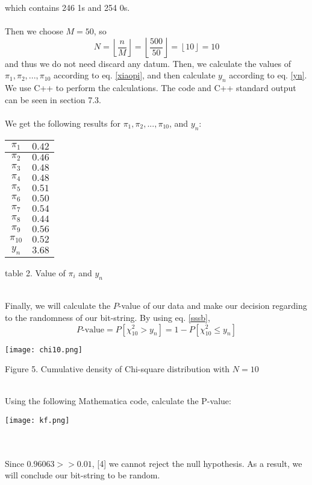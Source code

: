 \documentclass[a4paper,12pt]{article}
\begin{document}
\noindent which contains 246 1s and 254 0s.\\\\
Then we choose $M=50$, so $$N=\left\lfloor\frac{n}{M}\right\rfloor=
\left\lfloor\frac{500}{50}\right\rfloor=
\left\lfloor{10}\right\rfloor=10$$
 and thus we do not need discard any datum. Then, we calculate the values of $\pi_1,\pi_2,...,\pi_{10}$ according to eq. \eqref{xiaopi}, and then calculate $y_n$ according to eq. \eqref{yn}. We use C++ to perform the calculations. The code  and C++ standard output can be seen in section 7.3.
\\\\
We get the following results for $\pi_1,\pi_2,...,\pi_{10}$, and $y_n$:\\
\begin{table}[H]\centering
\begin{tabular}{|c|c|}
\hline
$\pi_1$ & $0.42$  \\ \hline
$\pi_2$ & $0.46$  \\ \hline
$\pi_3$ & $0.48$  \\ \hline
$\pi_4$ & $0.48$  \\ \hline
$\pi_5$ & $0.51$  \\ \hline
$\pi_6$ & $0.50$  \\ \hline
$\pi_7$ & $0.54$  \\ \hline
$\pi_8$ & $0.44$  \\ \hline
$\pi_9$ & $0.56$  \\ \hline
$\pi_{10}$ & $0.52$  \\ \hline
$y_n$ & $3.68$  \\ \hline
\end{tabular}
\end{table}
\centerline{table 2. Value of $\pi_i$ and $y_n$}
\noindent \\Finally, we will calculate the $P$-value of our data and make our decision regarding to the randomness of our bit-string. By using eq. \eqref{sssb},
$$
P\text{-value}=P\left[\chi_{10}^{2}>y_{n}\right]=1-P\left[\chi_{10}^{2} \leq y_{n}\right]
$$
\centerline{\texttt{[image: chi10.png]}}
\centerline{Figure 5. Cumulative density  of Chi-square distribution with $N=10$}

\noindent \\Using the following Mathematica code, calculate the P-value:\\
\centerline{\texttt{[image: kf.png]}}\\\\
Since $0.96063>>0.01$, [4] we cannot reject the null hypothesis. As a result, we will conclude our bit-string to be random.
\end{document}
